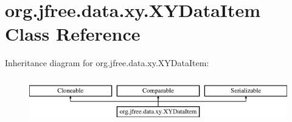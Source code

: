 \hypertarget{classorg_1_1jfree_1_1data_1_1xy_1_1_x_y_data_item}{}\section{org.\+jfree.\+data.\+xy.\+X\+Y\+Data\+Item Class Reference}
\label{classorg_1_1jfree_1_1data_1_1xy_1_1_x_y_data_item}
Inheritance diagram for org.\+jfree.\+data.\+xy.\+X\+Y\+Data\+Item\+:\begin{figure}[H]
\begin{center}
\leavevmode
\includegraphics[height=2.000000cm]{classorg_1_1jfree_1_1data_1_1xy_1_1_x_y_data_item}
\end{center}
\end{figure}
